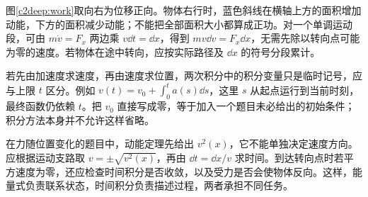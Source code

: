 
图\ref{c2deep:work}取向右为位移正向。物体右行时，蓝色斜线在横轴上方的面积增加动能，下方的面积减少动能；不能把全部面积大小都算成正功。对一个单调运动段，可由 $m\dot v=F_x$ 两边乘 $v\dd t=\dd x$，得到 $m v\dd v=F_x\dd x$，无需先除以转向点可能为零的速度。若物体在途中转向，应按实际路径及 $\dd x$ 的符号分段累计。


若先由加速度求速度，再由速度求位置，两次积分中的积分变量只是临时记号，应与上限 $t$ 区分。例如 $v(t)=v_0+\int_0^t a(s)\dd s$，这里 $s$ 从起点运行到当前时刻，最终函数仍依赖 $t$。把 $v_0$ 直接写成零，等于加入一个题目未必给出的初始条件；积分方法本身并不允许这样省略。

在力随位置变化的题目中，动能定理先给出 $v^2(x)$，它不能单独决定速度方向。应根据运动支路取 $v=\pm\sqrt{v^2(x)}$，再由 $\dd t=\dd x/v$ 求时间。到达转向点时若平方速度为零，还应检查时间积分是否收敛，以及受力是否会使物体反向。这样，能量式负责联系状态，时间积分负责描述过程，两者承担不同任务。

